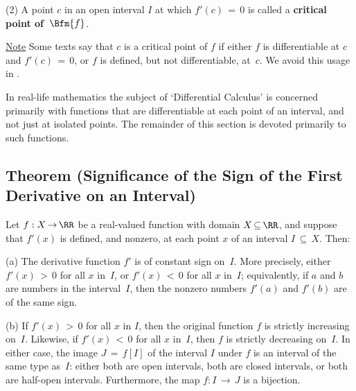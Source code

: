 \V

        (2) A point $c$ in an open interval $I$ at which $f'(c) \,=\, 0$ is called a {\bf critical point of~$\Bfm{f}$}.

        \underline{Note} Some texts say that $c$ is a critical point of $f$ if either $f$ is differentiable at $c$ and $f'(c) \,=\, 0$,
    or $f$ is defined, but not differentiable, at~$c$. We avoid this usage in {\ThisText}.

\VV

        In real-life mathematics the subject of `Differential Calculus' is concerned primarily with functions
    that are differentiable at each point of an interval, and not just at isolated points. The remainder of this section is devoted primarily to such functions.

\VV

            \subsection{\small{\bf Theorem} (Significance of the Sign of the First Derivative on an Interval)}
            \label{ThmE40.30}

        Let $f:X \,{\rightarrow}\, {\RR}$ be a real-valued function with domain $X \,{\subseteq}\, {\RR}$,
    and suppose that $f'(x)$ is defined, and nonzero, at each point $x$ of an interval $I \,{\subseteq}\, X$. Then:

\V

        (a) The derivative function $f'$ is of constant sign on~$I$. More precisely, either $f'(x)\,>\,0$ for all $x$ in~$I$, or $f'(x)\,<\,0$ for all $x$ in~$I$;
    equivalently, if $a$ and $b$ are numbers in the interval~$I$, then the nonzero numbers $f'(a)$ and $f'(b)$ are of the same sign.

\V

        (b) If $f'(x)\,>\,0$ for all $x$ in $I$, then the original function $f$ is strictly increasing on~$I$.
    Likewise, if $f'(x)\,<\,0$ for all $x$ in~$I$, then $f$ is strictly decreasing on~$I$.
    In either case, the image $J \,=\, f[I]$ of the interval $I$ under $f$ is an interval of the same type as~$I$:
    either both are open intervals, both are closed intervals, or both are half-open intervals.
    Furthermore, the map $f:I \,{\rightarrow}\, J$ is a bijection.

\V

